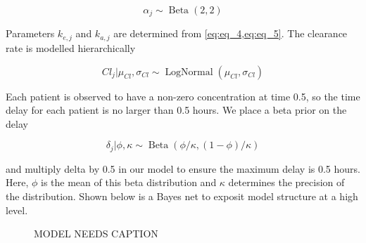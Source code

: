 \begin{equation}\label{eq:eq_7}
\alpha_j \sim \operatorname{Beta}(2,2) 
\end{equation}

\noindent Parameters $k_{e,j}$ and $k_{a,j}$ are determined from \cref{eq:eq_4,eq:eq_5}. The clearance rate is modelled hierarchically

\begin{equation}\label{eq:eq_8}
Cl_j \vert \mu_{Cl}, \sigma_{Cl}  \sim \operatorname{LogNormal}(\mu_{Cl}, \sigma_{Cl})
\end{equation}

Each patient is observed to have a non-zero concentration at time 0.5, so the time delay for each patient is no larger than 0.5 hours.  We place a beta prior on the delay

\begin{equation}\label{eq:eq_9}
\delta_j \vert \phi, \kappa \sim \operatorname{Beta}(\phi / \kappa, (1-\phi) / \kappa)
\end{equation}

\noindent and multiply delta by 0.5 in our model to ensure the maximum delay is 0.5 hours.  Here, $\phi$ is the mean of this beta distribution and $\kappa$ determines the precision of the distribution. Shown below is a Bayes net to exposit model structure at a high level.

\begin{figure}[h!]
	\centering
	\label{model_2}
	\caption{MODEL NEEDS CAPTION}
\end{figure}

